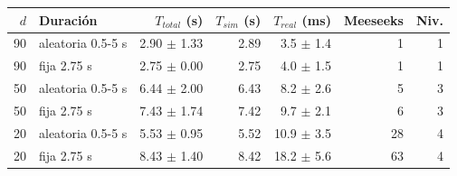 \begin{tabular}{rlrrrrr}
\toprule
$d$ & Duración & $T_{total}$ (s) & $T_{sim}$ (s) & $T_{real}$ (ms) & Meeseeks & Niv. \\
\midrule
90 & aleatoria 0.5-5 s & 2.90 $\pm$ 1.33 & 2.89 & 3.5 $\pm$ 1.4 & 1 & 1 \\
90 & fija 2.75 s & 2.75 $\pm$ 0.00 & 2.75 & 4.0 $\pm$ 1.5 & 1 & 1 \\
50 & aleatoria 0.5-5 s & 6.44 $\pm$ 2.00 & 6.43 & 8.2 $\pm$ 2.6 & 5 & 3 \\
50 & fija 2.75 s & 7.43 $\pm$ 1.74 & 7.42 & 9.7 $\pm$ 2.1 & 6 & 3 \\
20 & aleatoria 0.5-5 s & 5.53 $\pm$ 0.95 & 5.52 & 10.9 $\pm$ 3.5 & 28 & 4 \\
20 & fija 2.75 s & 8.43 $\pm$ 1.40 & 8.42 & 18.2 $\pm$ 5.6 & 63 & 4 \\
\bottomrule
\end{tabular}
